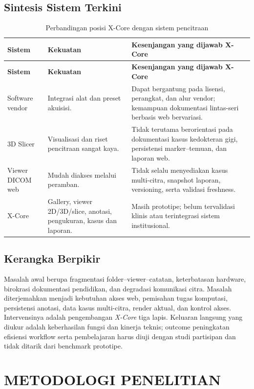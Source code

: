 \documentclass[12pt,a4paper,oneside]{report}
\newcommand{\xcore}{\textit{X-Core}}
\begin{document}
\section{Sintesis Sistem Terkini}
\begin{longtable}{p{3cm}p{4.3cm}p{5.4cm}}
\caption{Perbandingan posisi X-Core dengan sistem pencitraan}\label{tab:perbandingan-sistem}\\
\toprule
\textbf{Sistem} & \textbf{Kekuatan} & \textbf{Kesenjangan yang dijawab X-Core}\\\midrule
\endfirsthead
\toprule\textbf{Sistem} & \textbf{Kekuatan} & \textbf{Kesenjangan yang dijawab X-Core}\\\midrule\endhead
Software vendor & Integrasi alat dan preset akuisisi. & Dapat bergantung pada lisensi, perangkat, dan alur vendor; kemampuan dokumentasi lintas-seri berbasis web bervariasi.\\
3D Slicer & Visualisasi dan riset pencitraan sangat kaya. & Tidak terutama berorientasi pada dokumentasi kasus kedokteran gigi, persistensi marker--temuan, dan laporan web.\\
Viewer DICOM web & Mudah diakses melalui peramban. & Tidak selalu menyediakan kasus multi-citra, snapshot laporan, versioning, serta validasi freshness.\\
X-Core & Gallery, viewer 2D/3D/slice, anotasi, pengukuran, kasus dan laporan. & Masih prototipe; belum tervalidasi klinis atau terintegrasi sistem institusional.\\
\bottomrule
\end{longtable}

\section{Kerangka Berpikir}
Masalah awal berupa fragmentasi folder--viewer--catatan, keterbatasan hardware, birokrasi dokumentasi pendidikan, dan degradasi komunikasi citra. Masalah diterjemahkan menjadi kebutuhan akses web, pemisahan tugas komputasi, persistensi anotasi, data kasus multi-citra, render aktual, dan kontrol akses. Intervensinya adalah pengembangan \xcore{} tiga lapis. Keluaran langsung yang diukur adalah keberhasilan fungsi dan kinerja teknis; outcome peningkatan efisiensi workflow serta pembelajaran harus diuji dengan studi partisipan dan tidak ditarik dari benchmark prototipe.

\chapter{METODOLOGI PENELITIAN}
\label{bab:metode-lengkap}
\end{document}
